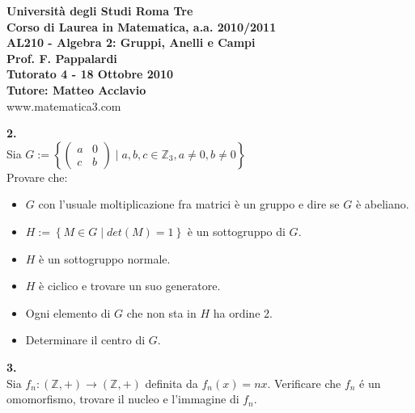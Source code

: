\documentclass[italian,a4paper,11pt]
{article}
\newcommand{\Z}{\mathbb Z}
\newcommand{\frecdl}{\longrightarrow}
\newcommand{\acc}{\`}
\begin{document}
\begin{center}

\textbf{Universit\`a degli Studi Roma Tre}\\

\textbf{Corso di Laurea in Matematica, a.a. 2010/2011}\\

\textbf{AL210 - Algebra 2: Gruppi, Anelli e Campi}\\

\textbf{Prof. F. Pappalardi}\\

\textbf{Tutorato 4 - 18 Ottobre 2010}\\

\textbf{Tutore: Matteo Acclavio}\\

www.matematica3.com\\
\end{center}

\vspace{0.4 cm}
\noindent
\begin{Ex}\textbf{ 2.}\\
Sia $G := \left\{\left(\begin{matrix} a & 0 \\ c & b \end{matrix}\right) \mid a, b, c \in \Z_3 , a \neq 0, b \neq 0 \right\}$ \\
Provare che:
\begin{itemize}
\item $G$ con l'usuale moltiplicazione fra matrici \acc e un gruppo e dire se $G$ \acc e abeliano.
\item $H := \left\{M \in G \mid det(M) =1\right\}$ \acc e un sottogruppo di $G$.
\item $H$ \acc e un sottogruppo normale.
\item $H$ \acc e ciclico e trovare un suo generatore.
\item Ogni elemento di $G$ che non sta in $H$ ha ordine 2.
\item Determinare il centro di $G$.
\end{itemize}
\end{Ex}

\vspace{0.4cm}
\noindent
\begin{Ex}\textbf{ 3.}\\
Sia $f_n : (\Z, +) \frecdl (\Z, +)$ definita da $f_n(x) = nx$. Verificare che $f_n$ \'e
un omomorfismo, trovare il nucleo e l'immagine di $f_n$.
\end{Ex}
\end{document}
